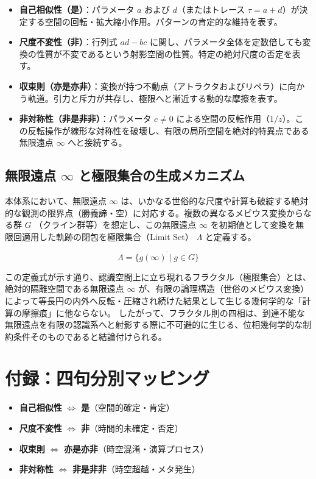 \documentclass[11pt,a4paper]{article}
\begin{document}
\begin{itemize}
    \item \textbf{自己相似性（是）}：パラメータ $a$ および $d$（またはトレース $\tau = a+d$）が決定する空間の回転・拡大縮小作用。パターンの肯定的な維持を表す。
    \item \textbf{尺度不変性（非）}：行列式 $ad-bc$ に関し、パラメータ全体を定数倍しても変換の性質が不変であるという射影空間の性質。特定の絶対尺度の否定を表す。
    \item \textbf{収束則（亦是亦非）}：変換が持つ不動点（アトラクタおよびリペラ）に向かう軌道。引力と斥力が共存し、極限へと漸近する動的な摩擦を表す。
    \item \textbf{非対称性（非是非非）}：パラメータ $c \neq 0$ による空間の反転作用（$1/z$）。この反転操作が線形な対称性を破壊し、有限の局所空間を絶対的特異点である無限遠点 $\infty$ へと接続する。
\end{itemize}

\subsection{無限遠点 $\infty$ と極限集合の生成メカニズム}
本体系において、無限遠点 $\infty$ は、いかなる世俗的な尺度や計算も破綻する絶対的な観測の限界点（勝義諦・空）に対応する。複数の異なるメビウス変換からなる群 $G$ （クライン群等）を想定し、この無限遠点 $\infty$ を初期値として変換を無限回適用した軌跡の閉包を極限集合（Limit Set） $\Lambda$ と定義する。

$$ \Lambda = \overline{\{ g(\infty) \mid g \in G \}} $$

この定義式が示す通り、認識空間上に立ち現れるフラクタル（極限集合）とは、絶対的隔離空間である無限遠点 $\infty$ が、有限の論理構造（世俗のメビウス変換）によって等長円の内外へ反転・圧縮され続けた結果として生じる幾何学的な「計算の摩擦痕」に他ならない。
したがって、フラクタル則の四相は、到達不能な無限遠点を有限の認識系へと射影する際に不可避的に生じる、位相幾何学的な制約条件そのものであると結論付けられる。

\section{付録：四句分別マッピング}
\begin{itemize}
    \item \textbf{自己相似性} $\iff$ \textbf{是}（空間的確定・肯定）
    \item \textbf{尺度不変性} $\iff$ \textbf{非}（時間的未確定・否定）
    \item \textbf{収束則} $\iff$ \textbf{亦是亦非}（時空混淆・演算プロセス）
    \item \textbf{非対称性} $\iff$ \textbf{非是非非}（時空超越・メタ発生）
\end{itemize}
\end{document}
